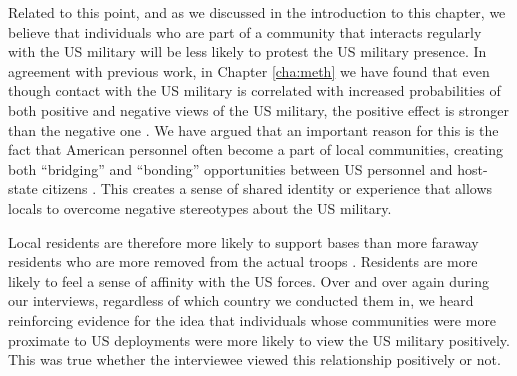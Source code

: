 
Related to this point, and as we discussed in the introduction to this chapter, we believe that individuals who are part of a community that interacts regularly with the US military will be less likely to protest the US military presence. In agreement with previous work, in Chapter \ref{cha:meth} we have found that even though contact with the US military is correlated with increased probabilities of both positive and negative views of the US military, the positive effect is stronger than the negative one \cite{Allen2020}. We have argued that an important reason for this is the fact that American personnel often become a part of local communities, creating both ``bridging'' and ``bonding'' opportunities between US personnel and host-state citizens \cite{Woolcock2000}.  This creates a sense of shared identity or experience that allows locals to overcome negative stereotypes about the US military. 

Local residents are therefore more likely to support bases than more faraway residents who are more removed from the actual troops \cite{Fitz2015,Flynn2018}. Residents are more likely to feel a sense of affinity with the US forces. Over and over again during our interviews, regardless of which country we conducted them in, we heard reinforcing evidence for the idea that individuals whose communities were more proximate to US deployments were more likely to view the US military positively. This was true whether the interviewee viewed this relationship positively or not. 


